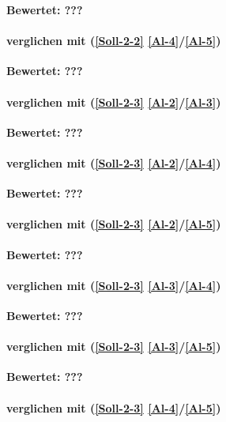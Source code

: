 \textbf{Bewertet: ???}


\paragraph*{  verglichen mit  (\ref{Soll-2-2} \ref{Al-4}/\ref{Al-5})}

\textbf{Bewertet: ???}


\paragraph*{  verglichen mit  (\ref{Soll-2-3} \ref{Al-2}/\ref{Al-3})}

\textbf{Bewertet: ???}

\paragraph*{  verglichen mit  (\ref{Soll-2-3} \ref{Al-2}/\ref{Al-4})}

\textbf{Bewertet: ???}

\paragraph*{  verglichen mit  (\ref{Soll-2-3} \ref{Al-2}/\ref{Al-5})}

\textbf{Bewertet: ???}

\paragraph*{  verglichen mit  (\ref{Soll-2-3} \ref{Al-3}/\ref{Al-4})}

\textbf{Bewertet: ???}

\paragraph*{  verglichen mit  (\ref{Soll-2-3} \ref{Al-3}/\ref{Al-5})}

\textbf{Bewertet: ???}


\paragraph*{  verglichen mit  (\ref{Soll-2-3} \ref{Al-4}/\ref{Al-5})}

